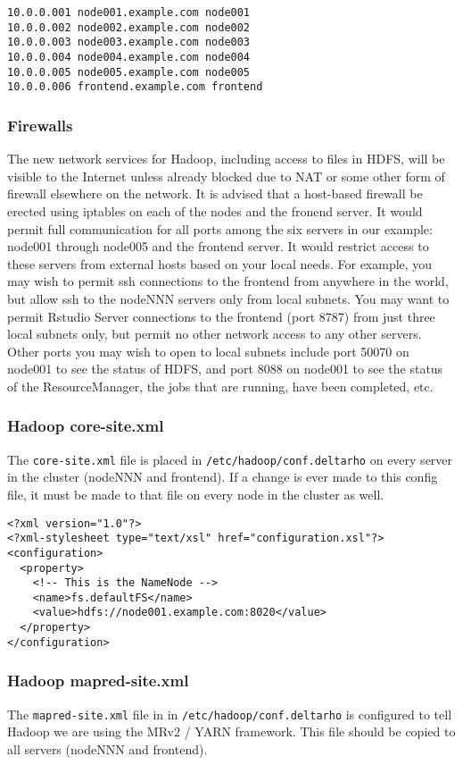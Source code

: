 \begin{verbatim}
10.0.0.001 node001.example.com node001
10.0.0.002 node002.example.com node002
10.0.0.003 node003.example.com node003
10.0.0.004 node004.example.com node004
10.0.0.005 node005.example.com node005
10.0.0.006 frontend.example.com frontend
\end{verbatim}

\subsubsection{Firewalls}
The new network services for Hadoop, including access to files in HDFS,
will be visible to the Internet unless already blocked due to NAT or
some other form of firewall elsewhere on the network.  It is advised
that a host-based firewall be erected using iptables on each of the
nodes and the fronend server.  It would permit full communication for
all ports among the six servers in our example: node001 through node005
and the frontend server.  It would restrict access to these servers
from external hosts based on your local needs.  For example, you may
wish to permit ssh connections to the frontend from anywhere in
the world, but allow ssh to the nodeNNN servers only from local subnets.
You may want to permit Rstudio Server connections to the frontend
(port 8787) from just three local subnets only, but permit no other
network access to any other servers.  Other ports you may wish to open
to local subnets include port 50070 on node001 to see the status of
HDFS, and port 8088 on node001 to see the status of the ResourceManager,
the jobs that are running, have been completed, etc.

\subsubsection{Hadoop core-site.xml}
The \verb|core-site.xml| file is placed in \verb|/etc/hadoop/conf.deltarho| on every server in the cluster (nodeNNN and frontend).  If a change is ever made to this config file, it must be made to that file on every node in the cluster as well.
\begin{verbatim}
<?xml version="1.0"?>
<?xml-stylesheet type="text/xsl" href="configuration.xsl"?>
<configuration>
  <property>
    <!-- This is the NameNode -->
    <name>fs.defaultFS</name>
    <value>hdfs://node001.example.com:8020</value>
  </property>
</configuration>
\end{verbatim}


\subsubsection{Hadoop mapred-site.xml}
The \verb|mapred-site.xml| file in in \verb|/etc/hadoop/conf.deltarho|
is configured to tell Hadoop we are using the MRv2 / YARN framework.
This file should be copied to all servers (nodeNNN and frontend).

